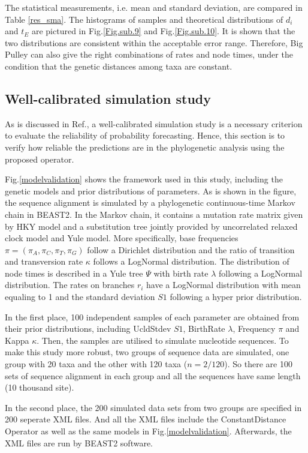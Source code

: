 \documentclass{bmcart}
\begin{document}
The statistical measurements, i.e. mean and standard deviation, are compared in Table \ref{res_sma}. The histograms of samples and theoretical distributions of ${d_i}$ and ${t_E}$ are pictured in Fig.\ref{Fig.sub.9} and Fig.\ref{Fig.sub.10}. It is shown that the two distributions are consistent within the acceptable error range. Therefore, Big Pulley can also give the right combinations of rates and node times, under the condition that the genetic distances among taxa are constant.


\subsection*{Well-calibrated simulation study}
As is discussed in Ref.\cite{dawid1982well}, a well-calibrated simulation study is a necessary criterion to evaluate the reliability of probability forecasting. Hence, this section is to verify how reliable the predictions are in the phylogenetic analysis using the proposed operator.

Fig.\ref{modelvalidation} shows the framework used in this study, including the genetic models and prior distributions of parameters. As is shown in the figure, the sequence alignment is simulated by a phylogenetic continuous-time Markov chain in BEAST2. In the Markov chain, it contains a mutation rate matrix given by HKY model and a substitution tree jointly provided by uncorrelated relaxed clock model and Yule model. More specifically, base frequencies $\pi = (\pi_{A}, \pi_{C}, \pi_{T}, \pi_{G})$ follow a Dirichlet distribution and the ratio of transition and transversion rate $\kappa$ follows a LogNormal distribution. The distribution of node times is described in a Yule tree $\Psi$ with birth rate $\lambda $ following a LogNormal distribution. The rates on branches $r_i$ have a LogNormal distribution with mean equaling to 1 and the standard deviation $S1$ following a hyper prior distribution.  

In the first place, 100 independent samples of each parameter are obtained from their prior distributions, including UcldStdev $S1$, BirthRate $\lambda $, Frequency $\pi$ and Kappa $\kappa$. Then, the samples are utilised to simulate nucleotide sequences. To make this study more robust, two groups of sequence data are simulated, one group with 20 taxa and the other with 120 taxa ($n=2/120$). So there are 100 sets of sequence alignment in each group and all the sequences have same length (10 thousand site). 

In the second place, the 200 simulated data sets from two groups are specified in 200 seperate XML files. And all the XML files include the ConstantDistance Operator as well as the same models in Fig.\ref{modelvalidation}.  Afterwards, the XML files are run by BEAST2 software. 
\end{document}
